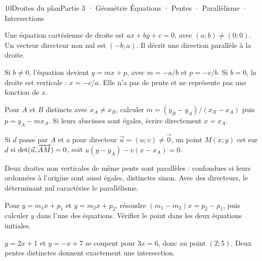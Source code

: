 \begin{ouverture}[vecteursplan]{10}{Droites du plan}{Partie 3 · Géométrie}
{Équations · Pentes · Parallélisme · Intersections}
\end{ouverture}
\pagestyle{otMain}\essentiel\fontsize{11}{15}\selectfont
{}
\begin{definition}Une équation cartésienne de droite est $ax+by+c=0$, avec $(a;b)\ne(0;0)$. Un vecteur directeur non nul est $(-b;a)$. Il décrit une direction parallèle à la droite.\end{definition}
\begin{propriete}Si $b\ne0$, l’équation devient $y=mx+p$, avec $m=-a/b$ et $p=-c/b$. Si $b=0$, la droite est verticale : $x=-c/a$. Elle n’a pas de pente et ne représente pas une fonction de $x$.\end{propriete}
\begin{savoirfaire}
Pour $A$ et $B$ distincts avec $x_A\ne x_B$, calculer $m=(y_B-y_A)/(x_B-x_A)$ puis $p=y_A-mx_A$. Si leurs abscisses sont égales, écrire directement $x=x_A$.
\end{savoirfaire}
\begin{savoirfaire}
Si $d$ passe par $A$ et a pour directeur $\vec u=(u;v)\ne\vec0$, un point $M(x;y)$ est sur $d$ si $\det(\vec u,\overrightarrow{AM})=0$, soit $u(y-y_A)-v(x-x_A)=0$.
\end{savoirfaire}
\clearpage
{}
\begin{propriete}Deux droites non verticales de même pente sont parallèles : confondues si leurs ordonnées à l’origine sont aussi égales, distinctes sinon. Avec des directeurs, le déterminant nul caractérise le parallélisme.\end{propriete}
\begin{savoirfaire}[Intersection]
Pour $y=m_1x+p_1$ et $y=m_2x+p_2$, résoudre $(m_1-m_2)x=p_2-p_1$, puis calculer $y$ dans l’une des équations. Vérifier le point dans les deux équations initiales.
\end{savoirfaire}
\begin{exemple}$y=2x+1$ et $y=-x+7$ se coupent pour $3x=6$, donc au point $(2;5)$. Deux pentes distinctes donnent exactement une intersection.\end{exemple}

